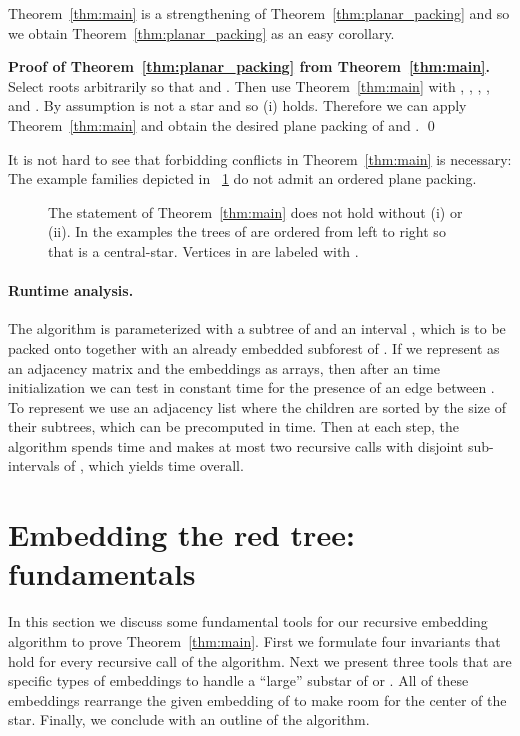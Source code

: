 \documentclass[11pt,a4paper,colorlinks=true,urlcolor=blue,citecolor=red]{article}
\theoremstyle{plain}
\newenvironment{proofof}[1]{\par\medskip\noindent\textbf{\sffamily Proof of #1.}~}{\qed\par\medskip}
\begin{document}
\noindent
Theorem~\ref{thm:main} is a strengthening of
Theorem~\ref{thm:planar_packing} and so we obtain
Theorem~\ref{thm:planar_packing} as an easy corollary.
\begin{proofof}{Theorem~\ref{thm:planar_packing} from
    Theorem~\ref{thm:main}}
  Select roots arbitrarily so that  and .
Then use Theorem~\ref{thm:main} with , , ,
  , and . By assumption  is not a star and so
  (i) holds. Therefore we can apply Theorem~\ref{thm:main} and obtain
  the desired plane packing of  and .
\end{proofof}

It is not hard to see that forbidding conflicts in
Theorem~\ref{thm:main} is necessary: The example families depicted in
\figurename~\ref{fig:confness} do not admit an ordered plane packing.
\begin{figure}[htbp]
  \centering {}\hfil {}\hfil \caption{The statement of Theorem~\ref{thm:main} does not hold without
    (i) or (ii). In the examples the trees of  are ordered from left
    to right so that  is a central-star. Vertices in  are
    labeled with \Lightning.\label{fig:confness}}
\end{figure}


\paragraph{Runtime analysis.} The algorithm is parameterized with a
subtree  of  and an interval , which  is to
be packed onto together with an already embedded subforest of . If
we represent  as an adjacency matrix and the embeddings as arrays,
then after an  time initialization we can test in constant time
for the presence of an edge between . To represent  we
use an adjacency list where the children are sorted by the size of their
subtrees, which can be precomputed in  time. Then at each
step, the algorithm spends  time and makes at most two recursive
calls with disjoint sub-intervals of , which yields  time
overall.

\section{Embedding the red tree: fundamentals}\label{sec:embedding_the_red_tree}

In this section we discuss some fundamental tools for our recursive
embedding algorithm to prove Theorem~\ref{thm:main}. First we formulate
four invariants that hold for every recursive call of the
algorithm. Next we present three tools that are specific types of
embeddings to handle a ``large'' substar of  or . All of these
embeddings rearrange the given embedding of  to make room for the
center of the star. Finally, we conclude with an outline of the
algorithm.
\end{document}

